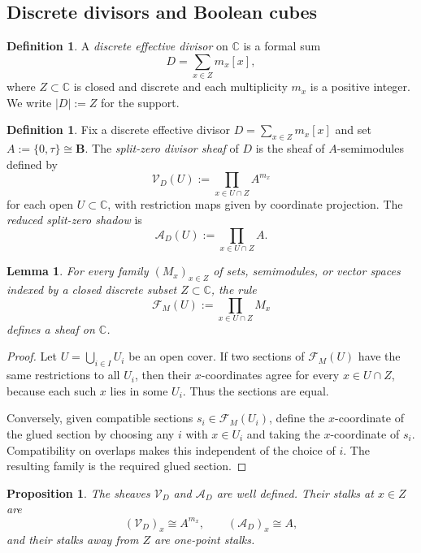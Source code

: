 \documentclass[11pt,a4paper]{article}
\newtheorem{proposition}[theorem]{Proposition}
\newtheorem{lemma}[theorem]{Lemma}
\theoremstyle{definition}
\newtheorem{definition}[theorem]{Definition}
\theoremstyle{remark}
\newcommand{\CC}{\mathbb C}
\newcommand{\BB}{\mathbf B}
\newcommand{\taup}{\tau}
\begin{document}
\subsection{Discrete divisors and Boolean cubes}

\begin{definition}
A \emph{discrete effective divisor} on $\CC$ is a formal sum
\[
D=\sum_{x\in Z} m_x[x],
\]
where $Z\subset\CC$ is closed and discrete and each multiplicity $m_x$ is a positive integer.  We write $|D|:=Z$ for the support.
\end{definition}

\begin{definition}
Fix a discrete effective divisor $D=\sum_{x\in Z} m_x[x]$ and set $A:=\{0,\taup\}\cong\BB$.  The \emph{split-zero divisor sheaf} of $D$ is the sheaf of $A$-semimodules defined by
\[
\mathcal V_D(U):=\prod_{x\in U\cap Z} A^{m_x}
\]
for each open $U\subset\CC$, with restriction maps given by coordinate projection.  The \emph{reduced split-zero shadow} is
\[
\mathcal A_D(U):=\prod_{x\in U\cap Z} A.
\]
\end{definition}

\begin{lemma}\label{lem:sheaf-product}
For every family $(M_x)_{x\in Z}$ of sets, semimodules, or vector spaces indexed by a closed discrete subset $Z\subset\CC$, the rule
\[
\mathcal F_M(U):=\prod_{x\in U\cap Z}M_x
\]
defines a sheaf on $\CC$.
\end{lemma}

\begin{proof}
Let $U=\bigcup_{i\in I}U_i$ be an open cover.  If two sections of $\mathcal F_M(U)$ have the same restrictions to all $U_i$, then their $x$-coordinates agree for every $x\in U\cap Z$, because each such $x$ lies in some $U_i$.  Thus the sections are equal.

Conversely, given compatible sections $s_i\in\mathcal F_M(U_i)$, define the $x$-coordinate of the glued section by choosing any $i$ with $x\in U_i$ and taking the $x$-coordinate of $s_i$.  Compatibility on overlaps makes this independent of the choice of $i$.  The resulting family is the required glued section.
\end{proof}

\begin{proposition}\label{prop:stalks-VD}
The sheaves $\mathcal V_D$ and $\mathcal A_D$ are well defined.  Their stalks at $x\in Z$ are
\[
(\mathcal V_D)_x\cong A^{m_x},
\qquad
(\mathcal A_D)_x\cong A,
\]
and their stalks away from $Z$ are one-point stalks.
\end{proposition}
\end{document}
